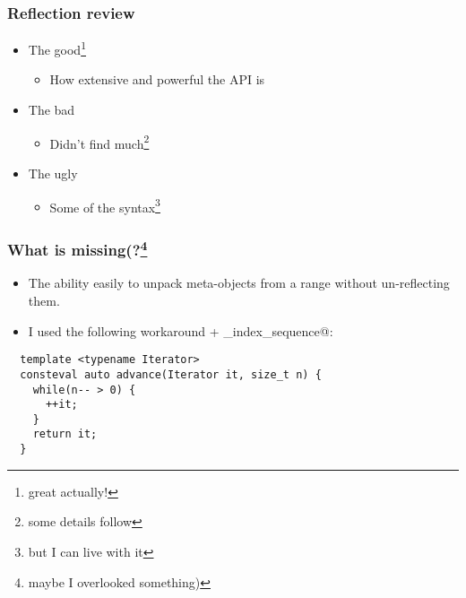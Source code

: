 \documentclass[compress,table,xcolor=table]{beamer}
\begin{document}
\begin{frame}
  \frametitle{Reflection review}
	\Huge
	\begin{itemize}
	\item{The good\footnote{great actually!}}
		\begin{itemize}
		\Large
		\item{How extensive and powerful the API is}
		\end{itemize}
	\item{The bad}
		\begin{itemize}
		\Large
		\item{Didn't find much\footnote{some details follow}}
		\end{itemize}
	\item{The ugly}
		\begin{itemize}
		\Large
		\item{Some of the syntax\footnote{but I can live with it}}
		\end{itemize}
	\end{itemize}
\end{frame}
\begin{frame}[fragile]
\frametitle{What is missing(?\footnote{maybe I overlooked something)}}
	\Large
	\begin{itemize}
	\item The ability easily to unpack meta-objects from a range without un-reflecting them.
	\item I used the following workaround + \verb@make_index_sequence@:
	\end{itemize}
  \begin{lstlisting}
  template <typename Iterator>
  consteval auto advance(Iterator it, size_t n) {
    while(n-- > 0) {
      ++it;
    }
    return it;
  }
  \end{lstlisting}
\end{frame}
\begin{frame}
	\Huge
	\vfill
	\LARGE
\end{frame}
\end{document}
